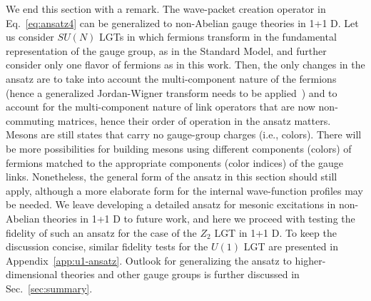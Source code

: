 \documentclass[a4paper,onecolumn,11pt,accepted=2024-10-11]{quantumarticle}
\begin{document}
We end this section with a remark. The wave-packet creation operator in Eq.~\eqref{eq:ansatz4} can be generalized to non-Abelian gauge theories in 1+1 D. Let us consider $SU(N)$ LGTs in which fermions transform in the fundamental representation of the gauge group, as in the Standard Model, and further consider only one flavor of fermions as in this work. Then, the only changes in the ansatz are to take into account the multi-component nature of the fermions (hence a generalized Jordan-Wigner transform needs to be applied~\cite{Davoudi:2022xmb,Raychowdhury:2019iki}) and to account for the multi-component nature of link operators that are now non-commuting matrices, hence their order of operation in the ansatz matters. Mesons are still states that carry no gauge-group charges (i.e., colors). There will be more possibilities for building mesons using different components (colors) of fermions matched to the appropriate components (color indices) of the gauge links. Nonetheless, the general form of the ansatz in this section should still apply, although a more elaborate form for the internal wave-function profiles may be needed. We leave developing a detailed ansatz for mesonic excitations in non-Abelian theories in 1+1 D to future work, and here we proceed with testing the fidelity of such an ansatz for the case of the $Z_2$ LGT in 1+1 D. To keep the discussion concise, similar fidelity tests for the $U(1)$ LGT are presented in Appendix~\ref{app:u1-ansatz}. Outlook for generalizing the ansatz to higher-dimensional theories and other gauge groups is further discussed in Sec.~\ref{sec:summary}.
\end{document}
